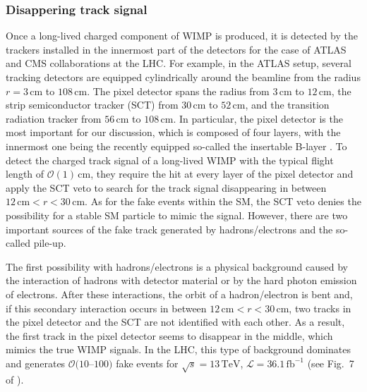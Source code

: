 \documentclass[12pt,twoside,book]{article}
\begin{document}


\subsubsection*{Disappering track signal}

Once a long-lived charged component of WIMP is produced, it is detected by the trackers installed in the innermost part of the detectors for the case of ATLAS and CMS collaborations at the LHC.
For example, in the ATLAS setup, several tracking detectors are equipped cylindrically around the beamline from the radius $r = 3\,\mathrm{cm}$ to $108\,\mathrm{cm}$.
The pixel detector spans the radius from $3\,\mathrm{cm}$ to $12\,\mathrm{cm}$, the strip semiconductor tracker (SCT) from $30\,\mathrm{cm}$ to $52\,\mathrm{cm}$, and the transition radiation tracker from $56\,\mathrm{cm}$ to $108\,\mathrm{cm}$.
In particular, the pixel detector is the most important for our discussion, which is composed of four layers, with the innermost one being the recently equipped so-called the insertable B-layer \cite{Capeans:1291633, CERN-LHCC-2012-009, Abbott:2018ikt}.
To detect the charged track signal of a long-lived WIMP with the typical flight length of $\mathcal{O} (1)\, \mathrm{cm}$, they require the hit at every layer of the pixel detector and apply the SCT veto to search for the track signal disappearing in between $12\,\mathrm{cm} < r < 30\,\mathrm{cm}$.
As for the fake events within the SM, the SCT veto denies the possibility for a stable SM particle to mimic the signal.
However, there are two important sources of the fake track generated by hadrons/electrons and the so-called pile-up.

The first possibility with hadrons/electrons is a physical background caused by the interaction of hadrons with detector material or by the hard photon emission of electrons.
After these interactions, the orbit of a hadron/electron is bent and, if this secondary interaction occurs in between $12\,\mathrm{cm} < r < 30\,\mathrm{cm}$, two tracks in the pixel detector and the SCT are not identified with each other.
As a result, the first track in the pixel detector seems to disappear in the middle, which mimics the true WIMP signals.
In the LHC, this type of background dominates and generates $\mathcal{O}(10$--$100)$ fake events for $\sqrt{s}=13\,\mathrm{TeV}$, $\mathcal{L} = 36.1\,\mathrm{fb}^{-1}$ (see Fig.~7 of \cite{Aaboud:2017mpt}).
\end{document}
